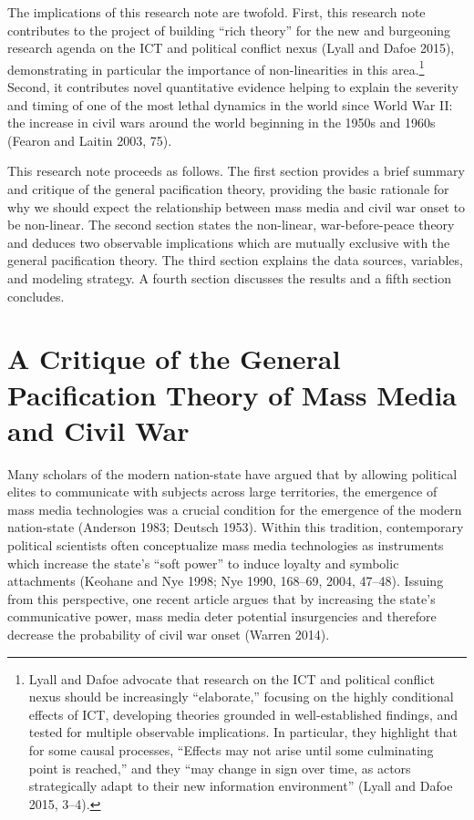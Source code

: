\documentclass[11pt,article,oneside]{memoir}
\begin{document}
The implications of this research note are twofold. First, this research
note contributes to the project of building ``rich theory'' for the new
and burgeoning research agenda on the ICT and political conflict nexus
(Lyall and Dafoe 2015), demonstrating in particular the importance of
non-linearities in this area.\footnote{Lyall and Dafoe advocate that
  research on the ICT and political conflict nexus should be
  increasingly ``elaborate,'' focusing on the highly conditional effects
  of ICT, developing theories grounded in well-established findings, and
  tested for multiple observable implications. In particular, they
  highlight that for some causal processes, ``Effects may not arise
  until some culminating point is reached,'' and they ``may change in
  sign over time, as actors strategically adapt to their new information
  environment'' (Lyall and Dafoe 2015, 3--4).} Second, it contributes
novel quantitative evidence helping to explain the severity and timing
of one of the most lethal dynamics in the world since World War II: the
increase in civil wars around the world beginning in the 1950s and 1960s
(Fearon and Laitin 2003, 75).

This research note proceeds as follows. The first section provides a
brief summary and critique of the general pacification theory, providing
the basic rationale for why we should expect the relationship between
mass media and civil war onset to be non-linear. The second section
states the non-linear, war-before-peace theory and deduces two
observable implications which are mutually exclusive with the general
pacification theory. The third section explains the data sources,
variables, and modeling strategy. A fourth section discusses the results
and a fifth section concludes.

\section{A Critique of the General Pacification Theory of Mass Media and
Civil
War}\label{a-critique-of-the-general-pacification-theory-of-mass-media-and-civil-war}

Many scholars of the modern nation-state have argued that by allowing
political elites to communicate with subjects across large territories,
the emergence of mass media technologies was a crucial condition for the
emergence of the modern nation-state (Anderson 1983; Deutsch 1953).
Within this tradition, contemporary political scientists often
conceptualize mass media technologies as instruments which increase the
state's ``soft power'' to induce loyalty and symbolic attachments
(Keohane and Nye 1998; Nye 1990, 168--69, 2004, 47--48). Issuing from
this perspective, one recent article argues that by increasing the
state's communicative power, mass media deter potential insurgencies and
therefore decrease the probability of civil war onset (Warren 2014).
\end{document}
